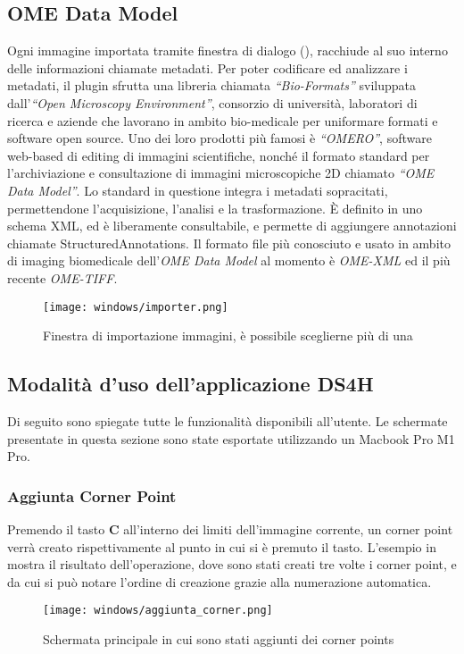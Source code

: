 \subsection{OME Data Model}
\noindent Ogni immagine importata tramite finestra di dialogo (), racchiude al suo interno delle informazioni chiamate metadati. Per poter codificare ed analizzare i metadati, il plugin sfrutta una libreria chiamata \textit{``Bio-Formats''} sviluppata dall'\textit{``Open Microscopy Environment''}, consorzio di università, laboratori di ricerca e aziende che lavorano in ambito bio-medicale per uniformare formati e software open source. Uno dei loro prodotti più famosi è \textit{``OMERO''}, software web-based di editing di immagini scientifiche, nonché il formato standard per l'archiviazione e consultazione di immagini microscopiche 2D chiamato \textit{``OME Data Model''}. Lo standard in questione integra i metadati sopracitati, permettendone l'acquisizione, l'analisi e la trasformazione. È definito in uno schema XML, ed è liberamente consultabile, e permette di aggiungere annotazioni chiamate StructuredAnnotations. Il formato file più conosciuto e usato in ambito di imaging biomedicale dell'\textit{OME Data Model} al momento è \textit{OME-XML} ed il più recente 
\textit{OME-TIFF}.

\begin{figure}[H]
    \centering
    \texttt{[image: windows/importer.png]}
    \caption{Finestra di importazione immagini, è possibile sceglierne più di una}
    \label{fig:9}
\end{figure}


\subsection{Modalità d'uso dell'applicazione DS4H}
\noindent Di seguito sono spiegate tutte le funzionalità disponibili all'utente. Le schermate presentate in questa sezione sono state esportate utilizzando un Macbook Pro M1 Pro.

\subsubsection{Aggiunta Corner Point}
\noindent Premendo il tasto \textbf{C} all'interno dei limiti dell'immagine corrente, un corner point verrà creato rispettivamente al punto in cui si è premuto il tasto.
L'esempio in  mostra il risultato dell'operazione, dove sono stati creati tre volte i corner point, e da cui si può notare l'ordine di creazione grazie alla numerazione automatica.
\begin{figure}[H]
    \centering
    \texttt{[image: windows/aggiunta\_corner.png]}
    \caption{Schermata principale in cui sono stati aggiunti dei corner points}
    \label{fig:10}
\end{figure}

